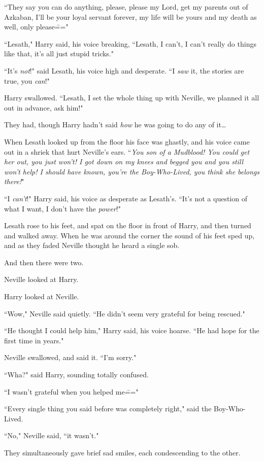 ``They say you can do anything, please, please my Lord, get my parents out of Azkaban, I'll be your loyal servant forever, my life will be yours and my death as well, only please\==="

``Lesath," Harry said, his voice breaking, ``Lesath, I can't, I can't really do things like that, it's all just stupid tricks."

``It's \emph{not}!" said Lesath, his voice high and desperate. ``I \emph{saw} it, the stories are true, you \emph{can}!"

Harry swallowed. ``Lesath, I set the whole thing up with Neville, we planned it all out in advance, ask him!"

They had, though Harry hadn't said \emph{how} he was going to do any of it{\ldots}

When Lesath looked up from the floor his face was ghastly, and his voice came out in a shriek that hurt Neville's ears. ``\emph{You son of a Mudblood! You could get her out, you just won't! I got down on my knees and begged you and you still won't help! I should have known, you're the Boy-Who-Lived, you think she belongs there!}"

``I \emph{can't}!" Harry said, his voice as desperate as Lesath's. ``It's not a question of what I want, I don't have the \emph{power}!"

Lesath rose to his feet, and spat on the floor in front of Harry, and then turned and walked away. When he was around the corner the sound of his feet sped up, and as they faded Neville thought he heard a single sob.

And then there were two.

Neville looked at Harry.

Harry looked at Neville.

``Wow," Neville said quietly. ``He didn't seem very grateful for being rescued."

``He thought I could help him," Harry said, his voice hoarse. ``He had hope for the first time in years."

Neville swallowed, and said it. ``I'm sorry."

``Wha?" said Harry, sounding totally confused.

``I wasn't grateful when you helped me\==="

``Every single thing you said before was completely right," said the Boy-Who-Lived.

``No," Neville said, ``it wasn't."

They simultaneously gave brief sad smiles, each condescending to the other.

